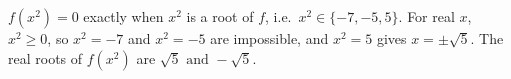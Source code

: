 $f(x^2)=0$ exactly when $x^2$ is a root of $f$, i.e.\ $x^2\in\{-7,-5,5\}$. For real $x$, $x^2\ge0$, so $x^2=-7$ and $x^2=-5$ are impossible, and $x^2=5$ gives $x=\pm\sqrt5$. The real roots of $f(x^2)$ are $\boxed{\sqrt5\text{ and }-\sqrt5}$.
